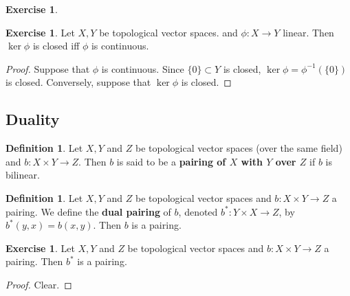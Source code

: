 \documentclass[12pt]{amsart}
\theoremstyle{definition}
\newtheorem{defn}[definition]{Definition}
\newtheorem{ex}[definition]{Exercise}
\newcommand{\tbf}[1]{\textbf{#1}}
\DeclareMathOperator*{\0}{\mbf{0}}
\DeclareMathOperator*{\1}{\mbf{1}}
\begin{document}
	\begin{ex}
		
	\end{ex}
	
	\begin{ex}
		Let $X, Y$ be topological vector spaces.  and $\phi: X \rightarrow Y$ linear. Then $\ker \phi$ is closed iff $\phi$ is continuous. 
	\end{ex}
	
	\begin{proof}
		Suppose that $\phi$ is continuous. Since $\{0\} \subset Y$ is closed, $\ker \phi = \phi^{-1}(\{0\})$ is closed. Conversely, suppose that $\ker \phi$ is closed. 
	\end{proof}
	
	
	
	
	
	
	
	
	
	
	
	
	
	
	
	
	
	
	
	
	
	
	
	\newpage
	\subsection{Duality}
	
	\begin{defn}
		Let $X,Y$ and $Z$ be topological vector spaces (over the same field) and $b : X \times Y \rightarrow Z$. Then $b$ is said to be a \tbf{pairing of $X$ with $Y$ over $Z$} if $b$ is bilinear. \\
	\end{defn}

	\begin{defn}
		Let $X,Y$ and $Z$ be topological vector spaces and $b : X \times Y \rightarrow Z$ a pairing. We define the \tbf{dual pairing} of $b$, denoted $b^*:Y \times X \rightarrow Z$, by $b^*(y,x) = b(x,y)$. Then $b$ is a pairing. 
	\end{defn}

	\begin{ex}
		Let $X,Y$ and $Z$ be topological vector spaces and $b : X \times Y \rightarrow Z$ a pairing. Then $b^*$ is a pairing.
	\end{ex}

	\begin{proof}
		Clear.
	\end{proof}
\end{document}
